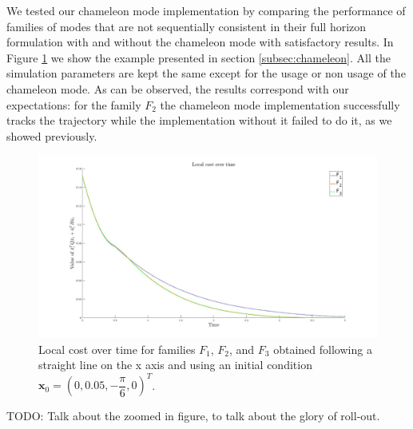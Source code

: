 \documentclass[12,twoside]{TFG-GM}
\theoremstyle{definition}
\theoremstyle{remark}
\begin{document}
We tested our chameleon mode implementation by comparing the performance of families of modes that are not sequentially consistent in their full horizon formulation with and without the chameleon mode with satisfactory results. In Figure \ref{fig:chameleon} we show the example presented in section \ref{subsec:chameleon}. All the simulation parameters are kept the same except for the usage or non usage of the chameleon mode. As can be observed, the results correspond with our expectations: for the family $F_2$ the chameleon mode implementation successfully tracks the trajectory while the implementation without it failed to do it, as we showed previously.

\begin{figure}[htb!]
\begin{center}
\includegraphics[width=16cm]{chameleon.jpg}
\end{center}
\caption{\label{fig:chameleon} \small Local cost over time for families $F_1$, $F_2$, and $F_3$ obtained following a straight line on the x axis and using an initial condition $\textbf{x}_0 = (0, 0.05, - \dfrac{\pi}{6}, 0)^T$.}
\end{figure}

TODO: Talk about the zoomed in figure, to talk about the glory of roll-out.
\end{document}
